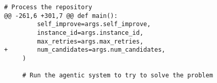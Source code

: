 \begin{lstlisting}[style=diffstyle]
     # Process the repository
@@ -261,6 +301,7 @@ def main():
         self_improve=args.self_improve,
         instance_id=args.instance_id,
         max_retries=args.max_retries,
+        num_candidates=args.num_candidates,
     )
 
     # Run the agentic system to try to solve the problem
\end{lstlisting}